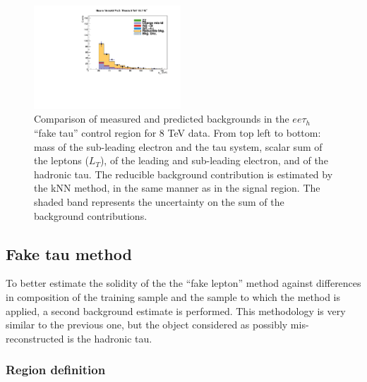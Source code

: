 \begin{figure}
\begin{center}
  \includegraphics[width=0.49\textwidth]{4_Analisys/pics/8TeV/plots/eet/f3/Full/final-f3-tPt-Full.pdf}
  \caption{Comparison of measured and predicted backgrounds in the $ee\tau_h$ ``fake tau'' control region for 8 TeV data.
  From top left to bottom: mass of the sub-leading electron and the tau system, scalar sum of the leptons \pT ($L_T$), \pT of the leading and sub-leading electron, and \pT of the hadronic tau.
  The reducible background contribution is estimated by the kNN method, in the same manner as in the signal region.
  The shaded band represents the uncertainty on the sum of the background contributions.
  }
  \label{fig:LLT_eet_f3_control_8TeV}
\end{center}
\end{figure}

\subsection{Fake tau method}

To better estimate the solidity of the the ``fake lepton'' method against differences in composition of the training sample and the sample to which the method is applied, a second background estimate is performed.
This methodology is very similar to the previous one, but the object considered as possibly mis-reconstructed is the hadronic tau.

\subsubsection{Region definition}

